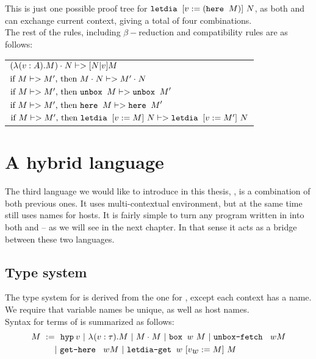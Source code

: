 This is just one possible proof tree for $\mbox{$\operatorname{\texttt{letdia}}_{}\ {[{v}_{} := (\mbox{$\operatorname{\texttt{here}}_{}\ {M}$})]}\ {N}$}$, as both  and \heree{} can exchange current context, giving a total of four combinations.\\

The rest of the rules, including $\beta-$reduction and compatibility rules are as follows:\\

\begin{spacing}{1.5}
\begin{tabular}{l}
$\mbox{$(\mbox{$\lambda_{} (v: A). M$}) \cdot_{} N$} |-> \mbox{$ [N | v] M$}$\\
$\mbox{\text{if}\ $M |-> M'$,\ \text{then}\ $\mbox{$M \cdot_{} N$} |->\mbox{$M' \cdot_{} N$}$}$\\[0.5cm]
$\mbox{\text{if}\ $M|-> M'$,\ \text{then}\ $\mbox{$\operatorname{\texttt{unbox}}_{}\ {M}$} |-> \mbox{$\operatorname{\texttt{unbox}}_{}\ {M}$}'$}$\\
$\mbox{\text{if}\ $M|-> M'$,\ \text{then}\ $\mbox{$\operatorname{\texttt{here}}_{}\ {M}$} |-> \mbox{$\operatorname{\texttt{here}}_{}\ {M}$}'$}$\\
$\mbox{\text{if}\ $M|-> M'$,\ \text{then}\ $\mbox{$\operatorname{\texttt{letdia}}_{}\ {[{v}_{} := M]}\ {N}$} |->\mbox{$\operatorname{\texttt{letdia}}_{}\ {[{v}_{} := M']}\ {N}$}$}$
\end{tabular}
\end{spacing}

\section{A hybrid language}

The third language we would like to introduce in this thesis, \langHyb{}, is a combination of both previous ones. It uses multi-contextual environment, but at the same time still uses names for hosts. It is fairly simple to turn any program written in \langHyb{} into both \langL{} and \langLF{} -- as we will see in the next chapter. In that sense it acts as a bridge between these two languages.

\subsection{Type system}
The type system for \langHyb{} is derived from the one for \langLF{}, except each context has a name. We require that variable names be unique, as well as host names.\\

Syntax for terms of \langHyb{} is summarized as follows:
\begin{align*}
 M ~:=&~~ \hyp {\varbr} ~|~ \lam{\varbr{}}{\tau} M ~|~ \appl{M}{M} ~|~ \bbox{\worldbr{}} M ~|~ \unboxfetch \worldbr{} M \\
	&|~ \gethere \worldbr{} M ~|~ \letdiaget{\worldbr{}}{\varbr{}}{\worldbr{}}{M}{M}
\end{align*}

